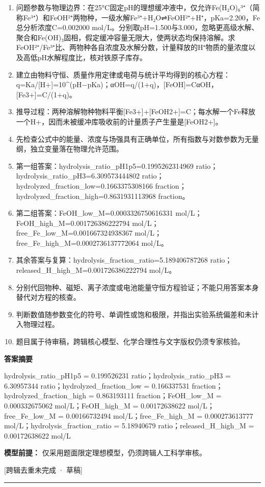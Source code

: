 \documentclass[UTF8,11pt,a4paper]{ctexart}
\begin{document}
\begin{enumerate}
\item 问题参数与物理边界：在25°C固定pH的理想缓冲液中，仅允许Fe(H₂O)₆³⁺（简称Fe³⁺）和FeOH²⁺两物种，一级水解Fe³⁺+H₂O⇌FeOH²⁺+H⁺，pKa=2.200，Fe总分析浓度C=0.002000 mol/L。分别取pH=1.500与3.000，忽略更高级水解、聚合和Fe(OH)₃固相，假定缓冲容量无限大，使两状态均保持溶解。求FeOH²⁺/Fe³⁺比、两物种各自浓度及水解分数，计量释放的H⁺物质的量浓度以及高低pH水解程度比，核对铁原子库存。
\item 建立由物料守恒、质量作用定律或电荷与统计平均得到的核心方程：q=Ka/[H+]=10\textasciicircum{}(pH−pKa)；αOH=q/(1+q)，[FeOH]=CαOH，[Fe3+]=C/(1+q)。
\item 推导过程：两种溶解物种物料平衡[Fe3+]+[FeOH2+]=C；每水解一个Fe释放一个H+，因而未被缓冲库吸收前的计量质子产生量是[FeOH2+]。
\item 先检查公式中的能量、浓度与场强具有正确单位，所有指数与对数参数为无量纲，独立变量落在物理允许范围。
\item 第一组答案：hydrolysis\_ratio\_pH1p5=0.1995262314969 ratio；hydrolysis\_ratio\_pH3=6.309573444802 ratio；hydrolyzed\_fraction\_low=0.1663375308166 fraction；hydrolyzed\_fraction\_high=0.8631931113968 fraction。
\item 第二组答案：FeOH\_low\_M=0.0003326750616331 mol/L；FeOH\_high\_M=0.001726386222794 mol/L；free\_Fe\_low\_M=0.001667324938367 mol/L；free\_Fe\_high\_M=0.0002736137772064 mol/L。
\item 其余答案与复算：hydrolysis\_fraction\_ratio=5.189406787268 ratio；released\_H\_high\_M=0.001726386222794 mol/L。
\item 分别代回物种、磁矩、离子浓度或电池能量守恒方程验证；不能只用答案本身替代对方程的核查。
\item 判断数值随参数变化的符号、单调性或饱和极限，并指出实验系统偏差和未计入物理过程。
\item 题目属于待审稿，跨辑核心模型、化学合理性与文字版权仍须专家核验。
\end{enumerate}
\noindent\textbf{答案摘要}\par
hydrolysis\_ratio\_pH1p5 = 0.199526231 ratio；hydrolysis\_ratio\_pH3 = 6.30957344 ratio；hydrolyzed\_fraction\_low = 0.166337531 fraction；hydrolyzed\_fraction\_high = 0.863193111 fraction；FeOH\_low\_M = 0.000332675062 mol/L；FeOH\_high\_M = 0.00172638622 mol/L；free\_Fe\_low\_M = 0.00166732494 mol/L；free\_Fe\_high\_M = 0.000273613777 mol/L；hydrolysis\_fraction\_ratio = 5.18940679 ratio；released\_H\_high\_M = 0.00172638622 mol/L\par
\noindent\textbf{模型前提：}
仅采用题面限定理想模型，仍须跨辑人工科学审核。\par
\noindent\textcolor{red!65!black}{[跨辑去重未完成 · 草稿]} \par
\medskip\hrule\medskip
{}
\end{document}
